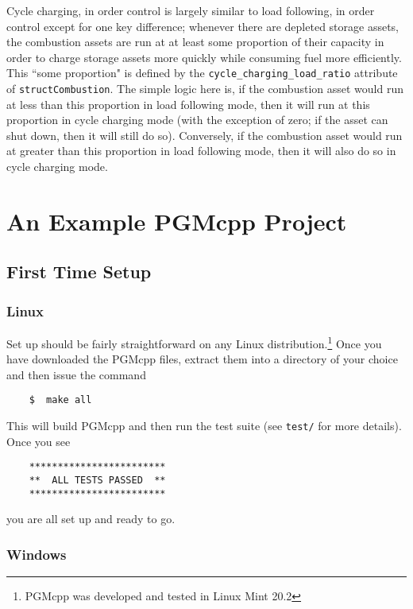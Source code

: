 \documentclass[12pt, letterpaper]{report}
\begin{document}
Cycle charging, in order control is largely similar to load following, in order control except for one key difference; whenever there are depleted storage assets, the combustion assets are run at at least some proportion of their capacity in order to charge storage assets more quickly while consuming fuel more efficiently. This ``some proportion" is defined by the \texttt{cycle\_charging\_load\_ratio} attribute of \texttt{structCombustion}. The simple logic here is, if the combustion asset would run at less than this proportion in load following mode, then it will run at this proportion in cycle charging mode (with the exception of zero; if the asset can shut down, then it will still do so). Conversely, if the combustion asset would run at greater than this proportion in load following mode, then it will also do so in cycle charging mode. 

\chapter{An Example PGMcpp Project}

\section{First Time Setup}

\subsection{Linux}

Set up should be fairly straightforward on any Linux distribution.\footnote{PGMcpp was developed and tested in Linux Mint 20.2} Once you have downloaded the PGMcpp files, extract them into a directory of your choice and then issue the command

\begin{verbatim}
    $  make all
\end{verbatim}

\noindent This will build PGMcpp and then run the test suite (see \texttt{test/} for more details). Once you see

\begin{verbatim}
    ************************
    **  ALL TESTS PASSED  **
    ************************
\end{verbatim}

\noindent you are all set up and ready to go.

\subsection{Windows}
\end{document}
